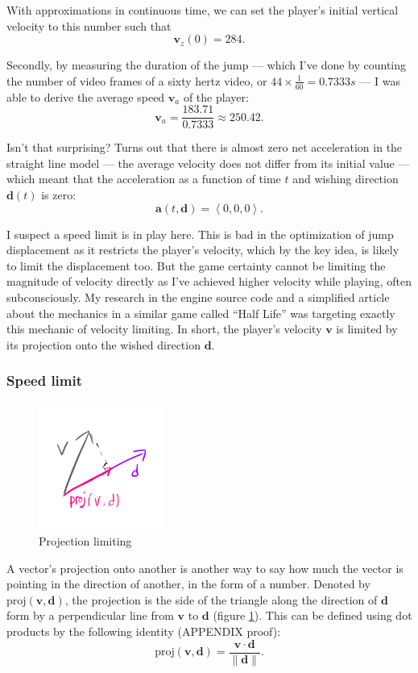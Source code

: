 \documentclass[a4paper,12pt]{article}
\newcommand{\tvec}[1]{\boldsymbol{#1}}
\newcommand{\tmag}[1]{\|#1\|}
\newcommand{\tang}[1]{\left\langle #1 \right\rangle}
\newcommand{\td}{\tvec{d}}
\newcommand{\ta}{\tvec{a}}
\newcommand{\tv}{\tvec{v}}
\begin{document}
With approximations in continuous time, we can set the player's initial vertical velocity to this number such that
\[
    \tv_{z}(0) = 284.
\]


Secondly, by measuring the duration of the jump --- which I've done by counting the number of video frames of a sixty hertz video, or $44 \times \frac{1}{60} = 0.7333 \si{s}$ --- I was able to derive the average speed $\tv_{a}$ of the player:
\[
    \tv_{a} = \frac{183.71}{0.7333} \approx 250.42.
\]

Isn't that surprising? Turns out that there is almost zero net acceleration in the straight line model --- the average velocity does not differ from its initial value --- which meant that the acceleration as a function of time $t$ and wishing direction $\td(t)$ is zero:
\[
    \ta(t, \td) = \tang{0, 0, 0}.
\]

I suspect a speed limit is in play here. This is bad in the optimization of jump displacement as it restricts the player's velocity, which by the key idea, is likely to limit the displacement too. But the game certainty cannot be limiting the magnitude of velocity directly as I've achieved higher velocity while playing, often subconsciously. My research in the engine source code \parencite{valvesoftware} and a simplified article about the mechanics in a similar game called ``Half Life'' \parencite{jwchong} was targeting exactly this mechanic of velocity limiting. In short, the player's velocity $\tv$ is limited by its projection onto the wished direction $\td$.

\subsubsection{Speed limit}
\begin{figure}
    \includegraphics[width=0.37\textwidth,right]{assets/2proj.png}
    \caption{Projection limiting}
    \label{fig:2proj}
\end{figure}
A vector's projection onto another is another way to say how much the vector is pointing in the direction of another, in the form of a number. Denoted by $\text{proj}(\tv, \td)$, the projection is the side of the triangle along the direction of $\td$ form by a perpendicular line from $\tv$ to $\td$ (figure \ref{fig:2proj}). This can be defined using dot products by the following identity (APPENDIX proof):
\[
    \text{proj}(\tv, \td) = \frac{\tv \cdot \td}{\tmag{\td}}.
\]
\end{document}
